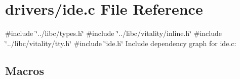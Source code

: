 \hypertarget{a00023}{}\section{drivers/ide.c File Reference}
\label{a00023}
{\ttfamily \#include \char`\"{}../libc/types.\+h\char`\"{}}\newline
{\ttfamily \#include \char`\"{}../libc/vitality/inline.\+h\char`\"{}}\newline
{\ttfamily \#include \char`\"{}../libc/vitality/tty.\+h\char`\"{}}\newline
{\ttfamily \#include \char`\"{}ide.\+h\char`\"{}}\newline
Include dependency graph for ide.\+c\+:
\subsection*{Macros}
